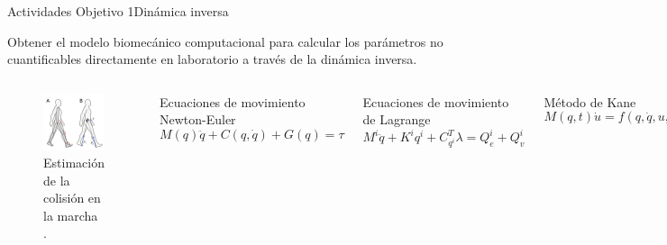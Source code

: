 \documentclass[10pt]{beamer}
\begin{document}
\begin{frame}{Actividades Objetivo 1}{Dinámica inversa}

\begin{block}{\small{Obtener el modelo biomecánico computacional para calcular los parámetros no cuantificables directamente en laboratorio a través de la dinámica inversa.}}
\end{block}
\begin{columns}[t]
\column{60 mm}
\begin{figure}
\begin{centering}
\includegraphics[scale=0.45]{Feathergraphics/RBvsLAB}
\par\end{centering}
\caption{\scriptsize {\scriptsize {Estimación de la colisión en la marcha \cite{Zelik2010}.}}}
\end{figure}
\column{60 mm}
\begin{block}{\scriptsize {Ecuaciones de movimiento Newton-Euler}}
\begin{equation}
M(q)\ddot{q}+C(q,\dot{q})+G(q)=\tau
\end{equation}
\end{block}
\begin{block}{\scriptsize {Ecuaciones de movimiento de Lagrange}}
\begin{equation}
M^{i}\ddot{q}+K^{i}q^{i}+C_{q^{i}}^{T}\lambda=Q_{e}^{i}+Q_{v}^{i}
\end{equation}
\end{block}
\begin{block}{\scriptsize {Método de Kane}}
\begin{equation}
M(q,t)\dot{u}=f(q,\dot{q},u,t)
\end{equation}
\end{block}
\end{columns}
\end{frame}
\end{document}

